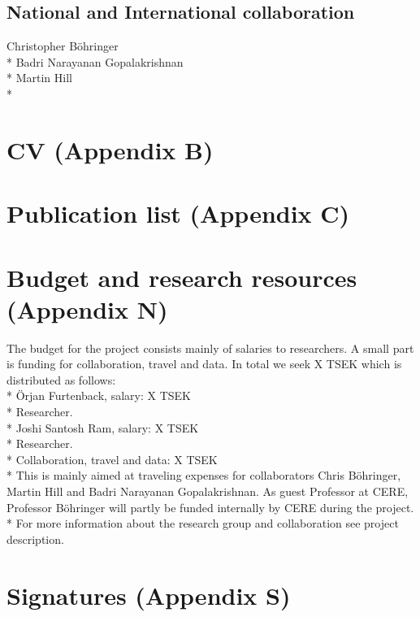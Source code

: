 \documentclass[10pt,a4paper]{article}
\begin{document}
\subsection{National and International collaboration}
Christopher Böhringer\\*
Badri Narayanan Gopalakrishnan\\*
Martin Hill\\*

\section{CV (Appendix B)}
\section{Publication list (Appendix C)}
\section{Budget and research resources (Appendix N)}
The budget for the project consists mainly of salaries to researchers. A small part is funding
for collaboration, travel and data. In total we seek X TSEK which is distributed as follows:\\*
Örjan Furtenback, salary: X TSEK\\*
Researcher.\\*
Joshi Santosh Ram, salary: X TSEK\\*
Researcher.\\*
Collaboration, travel and data: X TSEK\\*
This is mainly aimed at traveling expenses for collaborators Chris Böhringer, Martin Hill and Badri Narayanan Gopalakrishnan. As guest Professor at CERE, Professor Böhringer will partly be funded internally
by CERE during the project.\\*
For more information about the research group and collaboration see project description.
\section{Signatures (Appendix S)}



\pagebreak
{}


\end{document}
